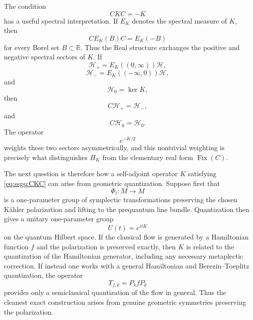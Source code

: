 \documentclass[a4paper,11pt]{article}
\theoremstyle{definition}
\newcommand{\cH}{\mathcal{H}}
\begin{document}
The condition
\begin{equation}
    CKC=-K
\end{equation}
has a useful spectral interpretation.  If $E_K$ denotes the spectral measure
of $K$, then
\begin{equation}
    CE_K(B)C
    =
    E_K(-B)
\end{equation}
for every Borel set $B\subset\mathbb R$.  Thus the Real structure exchanges
the positive and negative spectral sectors of $K$.  If
\begin{equation}
    \cH_+
    =
    E_K((0,\infty))\cH,
\end{equation}
\begin{equation}
    \cH_-
    =
    E_K((-\infty,0))\cH,
\end{equation}
and
\begin{equation}
    \cH_0=\ker K,
\end{equation}
then
\begin{equation}
    C\cH_+=\cH_-,
\end{equation}
and
\begin{equation}
    C\cH_0=\cH_0.
\end{equation}
The operator
\begin{equation}
    e^{-K/2}
\end{equation}
weights these two sectors asymmetrically, and this nontrivial weighting is
precisely what distinguishes $H_K$ from the elementary real form
$\operatorname{Fix}(C)$.

The next question is therefore how a self-adjoint operator $K$ satisfying
\eqref{eq:ssgq:CKC} can arise from geometric quantization.  Suppose first that
\begin{equation}
    \Phi_t:M\rightarrow M
\end{equation}
is a one-parameter group of symplectic transformations preserving the chosen
K\"ahler polarization and lifting to the prequantum line bundle.  Quantization
then gives a unitary one-parameter group
\begin{equation}
    U(t)=e^{itK}
\end{equation}
on the quantum Hilbert space.  If the classical flow is generated by a
Hamiltonian function $f$ and the polarization is preserved exactly, then $K$
is related to the quantization of the Hamiltonian generator, including any
necessary metaplectic correction.  If instead one works with a general
Hamiltonian and Berezin--Toeplitz quantization, the operator
\begin{equation}
    T_{f,k}=P_k fP_k
\end{equation}
provides only a semiclassical quantization of the flow in general.  Thus the
cleanest exact construction arises from genuine geometric symmetries
preserving the polarization.
\end{document}
